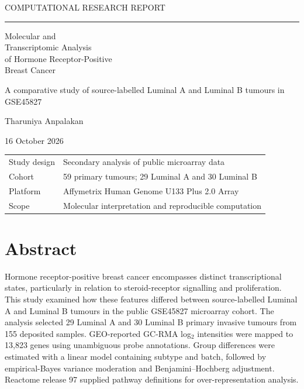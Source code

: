 \documentclass[11pt,a4paper]{article}
\begin{document}
\begin{titlepage}
\thispagestyle{empty}
\setlength{\parindent}{0pt}
\vspace*{14mm}
{\sffamily\small COMPUTATIONAL RESEARCH REPORT\par}
\vspace{8mm}
{\color{ink}\rule{\linewidth}{0.6pt}\par}
\vspace{10mm}
{\fontsize{27}{33}\selectfont\bfseries\raggedright Molecular and\\Transcriptomic Analysis\\of Hormone Receptor-Positive\\Breast Cancer\par}
\vspace{9mm}
{\large A comparative study of source-labelled Luminal A and Luminal B tumours in GSE45827\par}
\vspace{22mm}
{\large Tharuniya Anpalakan\par}
\vspace{3mm}
{16 October 2026\par}
\vfill
\noindent\begin{tabular}{@{}ll@{}}
Study design & Secondary analysis of public microarray data\\
Cohort & 59 primary tumours; 29 Luminal A and 30 Luminal B\\
Platform & Affymetrix Human Genome U133 Plus 2.0 Array\\
Scope & Molecular interpretation and reproducible computation
\end{tabular}
\vspace{8mm}
\end{titlepage}
\section*{Abstract}
Hormone receptor-positive breast cancer encompasses distinct transcriptional states, particularly in relation to steroid-receptor signalling and proliferation. This study examined how these features differed between source-labelled Luminal A and Luminal B tumours in the public GSE45827 microarray cohort. The analysis selected 29 Luminal A and 30 Luminal B primary invasive tumours from 155 deposited samples. GEO-reported GC-RMA log$_2$ intensities were mapped to 13,823 genes using unambiguous probe annotations. Group differences were estimated with a linear model containing subtype and batch, followed by empirical-Bayes variance moderation and Benjamini--Hochberg adjustment. Reactome release 97 supplied pathway definitions for over-representation analysis.
\end{document}
